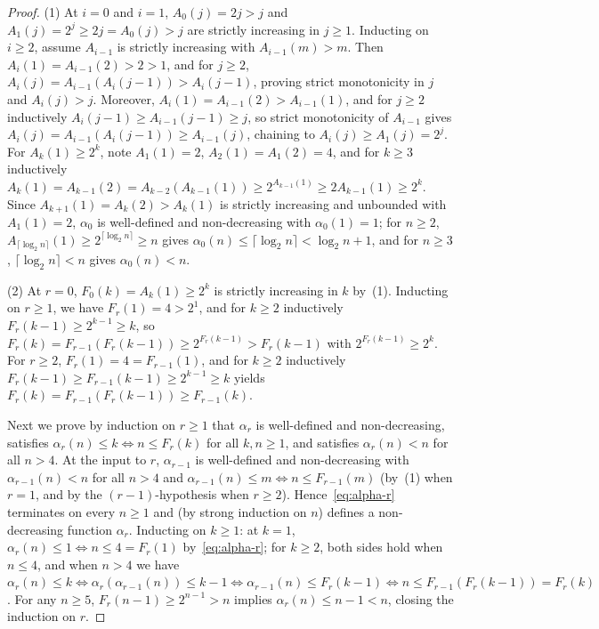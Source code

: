 \documentclass[11pt]{article}
\theoremstyle{definition}
\theoremstyle{remark}
\begin{document}
\begin{proof}
(1) At $i = 0$ and $i = 1$, $A_0(j) = 2j > j$ and $A_1(j) = 2^j \ge 2j = A_0(j) > j$ are strictly increasing in $j \ge 1$. Inducting on $i \ge 2$, assume $A_{i-1}$ is strictly increasing with $A_{i-1}(m) > m$. Then $A_i(1) = A_{i-1}(2) > 2 > 1$, and for $j \ge 2$, $A_i(j) = A_{i-1}(A_i(j - 1)) > A_i(j - 1)$, proving strict monotonicity in $j$ and $A_i(j) > j$. Moreover, $A_i(1) = A_{i-1}(2) > A_{i-1}(1)$, and for $j \ge 2$ inductively $A_i(j - 1) \ge A_{i-1}(j - 1) \ge j$, so strict monotonicity of $A_{i-1}$ gives $A_i(j) = A_{i-1}(A_i(j - 1)) \ge A_{i-1}(j)$, chaining to $A_i(j) \ge A_1(j) = 2^j$. For $A_k(1) \ge 2^k$, note $A_1(1) = 2$, $A_2(1) = A_1(2) = 4$, and for $k \ge 3$ inductively $A_k(1) = A_{k-1}(2) = A_{k-2}(A_{k-1}(1)) \ge 2^{A_{k-1}(1)} \ge 2 A_{k-1}(1) \ge 2^k$. Since $A_{k+1}(1) = A_k(2) > A_k(1)$ is strictly increasing and unbounded with $A_1(1) = 2$, $\alpha_0$ is well-defined and non-decreasing with $\alpha_0(1) = 1$; for $n \ge 2$, $A_{\lceil \log_2 n \rceil}(1) \ge 2^{\lceil \log_2 n \rceil} \ge n$ gives $\alpha_0(n) \le \lceil \log_2 n \rceil < \log_2 n + 1$, and for $n \ge 3$, $\lceil \log_2 n \rceil < n$ gives $\alpha_0(n) < n$.

(2) At $r = 0$, $F_0(k) = A_k(1) \ge 2^k$ is strictly increasing in $k$ by~(1). Inducting on $r \ge 1$, we have $F_r(1) = 4 > 2^1$, and for $k \ge 2$ inductively $F_r(k - 1) \ge 2^{k-1} \ge k$, so $F_r(k) = F_{r-1}(F_r(k - 1)) \ge 2^{F_r(k - 1)} > F_r(k - 1)$ with $2^{F_r(k - 1)} \ge 2^k$. For $r \ge 2$, $F_r(1) = 4 = F_{r-1}(1)$, and for $k \ge 2$ inductively $F_r(k - 1) \ge F_{r-1}(k - 1) \ge 2^{k-1} \ge k$ yields $F_r(k) = F_{r-1}(F_r(k - 1)) \ge F_{r-1}(k)$.

Next we prove by induction on $r \ge 1$ that $\alpha_r$ is well-defined and non-decreasing, satisfies $\alpha_r(n) \le k \iff n \le F_r(k)$ for all $k, n \ge 1$, and satisfies $\alpha_r(n) < n$ for all $n > 4$. At the input to $r$, $\alpha_{r-1}$ is well-defined and non-decreasing with $\alpha_{r-1}(n) < n$ for all $n > 4$ and $\alpha_{r-1}(n) \le m \iff n \le F_{r-1}(m)$ (by~(1) when $r = 1$, and by the $(r - 1)$-hypothesis when $r \ge 2$). Hence~\eqref{eq:alpha-r} terminates on every $n \ge 1$ and (by strong induction on $n$) defines a non-decreasing function $\alpha_r$. Inducting on $k \ge 1$: at $k = 1$, $\alpha_r(n) \le 1 \iff n \le 4 = F_r(1)$ by~\eqref{eq:alpha-r}; for $k \ge 2$, both sides hold when $n \le 4$, and when $n > 4$ we have $\alpha_r(n) \le k \iff \alpha_r(\alpha_{r-1}(n)) \le k - 1 \iff \alpha_{r-1}(n) \le F_r(k - 1) \iff n \le F_{r-1}(F_r(k - 1)) = F_r(k)$. For any $n \ge 5$, $F_r(n - 1) \ge 2^{n-1} > n$ implies $\alpha_r(n) \le n - 1 < n$, closing the induction on $r$.


\end{proof}
\end{document}
